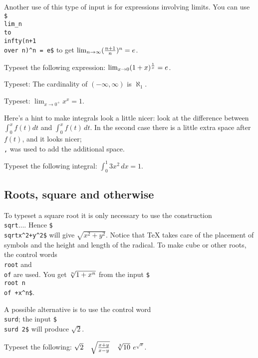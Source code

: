 Another use of this type of input is for expressions 
involving limits.  You can use 
{\tt \$\\lim\_\lb n\\to \\infty\rb (\lb n+1 \\over n\rb)\^{}n = e\$} 
to get $\lim_{n\to \infty} ({n+1\over n})^n = e$. 
 
\exercise Typeset the following expression: $\lim_{x\to 0} 
(1+x)^{1\over x}=e$. 
 
\exercise Typeset: The cardinality of $(-\infty, \infty)$ is $\aleph_1$. 
 
\exercise Typeset: $\lim_{x\to {0^+}} x^x = 1$. 
\bigskip 
 
Here's a hint to make integrals look a little nicer: look at the 
difference between $\int_0^x f(t) dt$ and $\int_0^x f(t)\, dt$\null. 
In the second case there is a little extra space after 
$f(t)$, and it looks nicer; {\tt \\,} was used to add the 
additional space. 
\toindex{,} 
 
\exercise Typeset the following integral: $\int_0^1 3x^2\,dx = 1$. 
 
\subsection{Roots, square and otherwise} 
 
To typeset a square root it is only necessary to use the construction 
{\tt \\sqrt\lb$\ldots$\rb}\null. Hence {\tt \$\\sqrt\lb x\^{}2+y\^{}2\rb\$} 
will give $\sqrt{x^2+y^2}$\null.  Notice that \TeX{} takes care of the 
placement of symbols and the height and length of the radical. 
To make cube or other roots, the control words {\tt \\root} and {\tt 
\\of} are used.  You get $\root n \of {1+x^n}$ from the 
input {\tt \$\\root n \\of {}+x\^{}n\rb\$}. 
 
A possible alternative is to use the control word {\tt \\surd}; the 
input {\tt \$\\surd 2\$} will produce $\surd 2$. 
 
\exercise Typeset the following: $\sqrt2 \quad \sqrt {x+y\over x-y} 
\quad \root 3 \of {10}$ \quad $e^{\sqrt x}$. 
 
